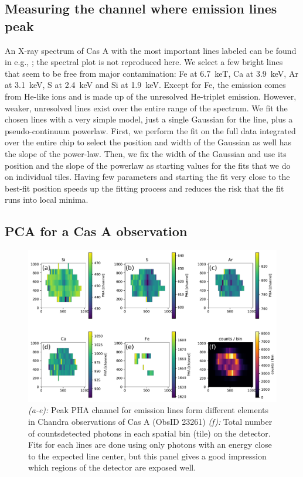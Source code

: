 \documentclass[]{spie}  %
\begin{document}
\subsection{Measuring the channel where emission lines peak}
An X-ray spectrum of Cas A with the most important lines labeled can be found in e.g., ; the spectral plot is not reproduced here. We select a few bright lines that seem to be free from major contamination: Fe at 6.7~keT, Ca at 3.9~keV, Ar at 3.1~keV, S at 2.4~keV and Si at 1.9~keV. Except for Fe, the emission comes from He-like ions and is made up of the unresolved He-triplet emission. However, weaker, unresolved lines exist over the entire range of the spectrum. We fit the chosen lines with a very simple model, just a single Gaussian for the line, plus a pseudo-continuum powerlaw. First, we perform the fit on the full data integrated over the entire chip to select the position and width of the Gaussian as well has the slope of the power-law. Then, we fix the width of the Gaussian and use its position and the slope of the powerlaw as starting values for the fits that we do on individual tiles. Having few parameters and starting the fit very close to the best-fit position speeds up the fitting process and reduces the risk that the fit runs into local minima.


\subsection{PCA for a Cas A observation}
\begin{figure} [ht]
  \begin{center}
    \includegraphics[width=\textwidth]{figures/CasAlines.pdf}
  \end{center}
  \caption
      {\emph{(a-e):} Peak PHA channel for emission lines form different elements in Chandra observations of Cas A (ObsID 23261) \emph{(f):} Total number of countsdetected photons in each spatial bin (tile) on the detector. Fits for each lines are done using only photons with an energy close to the expected line center, but this panel gives a good impression which regions of the detector are exposed well.
        \label{fig:CasAlines}}
\end{figure}
\end{document}
